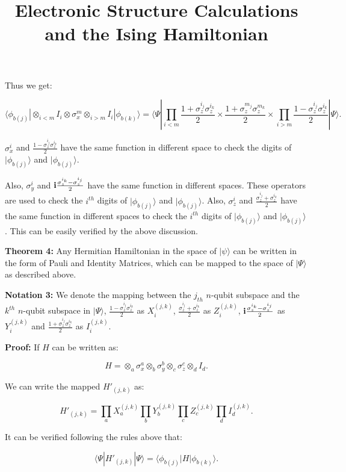 \documentclass{article}
\newcommand\x[1]{\sigma_x^{#1}}
\newcommand\y[1]{\sigma_y^{#1}}
\newcommand\z[1]{\sigma_z^{#1}}\title{Electronic Structure Calculations and the Ising Hamiltonian}
\begin{document}
Thus we get:

\begin{equation}
\langle\phi_{b(j)}|\otimes_{i<m} I_i\otimes \x{m}\otimes_{i>m}I_i|\phi_{b(k)}\rangle= \langle\Psi|\prod_{i<m}\frac{1+\z{i_j}\z{i_k}}{2}\times\frac{1+\z{m_j}\z{m_k}}{2}\times\prod_{i>m}\frac{1-\z{i_j}\z{i_k}}{2}|\Psi\rangle .
\end{equation}

 $\x{i}$ and $\frac{1-\z{i_j}\z{i_k}}{2}$ have the  same function in different space to check the digits of $|\phi_{b(j)}\rangle$ and $|\phi_{b(j)}\rangle$.

Also, $\y{i}$ and ${\bf i}\frac{\z{i_k}-\z{i_j}}{2}$ have the same function in different spaces.  These operators are used to check the $i^{th}$ digits of $|\phi_{b(j)}\rangle$ and $|\phi_{b(j)}\rangle$. Also, $\z{i}$ and $\frac{\z{i_j}+\z{i_k}}{2}$ have the  same function in different spaces to check the $i^{th}$ digits of $|\phi_{b(j)}\rangle$ and $|\phi_{b(j)}\rangle$. This can be easily verified by the above discussion.

{\bf Theorem 4:} Any Hermitian Hamiltonian in the space of $|\psi\rangle$ can be written in the form of Pauli and Identity Matrices, which can be mapped to the space of $|\Psi\rangle$ as  described above.

{\bf Notation 3:} We denote the mapping between the $j_{th}$ $n$-qubit subspace and the $k^{th}$ $n$-qubit subspace in $|\Psi\rangle$, $\frac{1-\z{i_j}\z{i_k}}{2}$ as $X_i^{(j,k)}$, $\frac{\z{i_j}+\z{i_k}}{2}$ as $Z_i^{(j,k)}$, ${\bf i}\frac{\z{i_k}-\z{i_j}}{2}$ as $Y_i^{(j,k)}$ and $\frac{1+\z{i_j}\z{i_k}}{2}$ as $I_i^{(j,k)}$.

{\bf Proof:}
If $H$ can be written as:

\begin{equation}
H=\otimes_a\x{a}\otimes_b\y{b}\otimes_c\z{c}\otimes_dI_{d} .
\end{equation}

We can write the mapped $H'_{(j,k)}$ as:

\begin{equation}
H'_{(j,k)}=\prod_aX_a^{(j,k)}\prod_bY_b^{(j,k)}\prod_cZ_c^{(j,k)}\prod_dI_d^{(j,k)} .
\end{equation}

It can be verified following the rules above that:

\begin{equation}
\langle\Psi|H'_{(j,k)}|\Psi\rangle=\langle\phi_{b(j)}|H|\phi_{b(k)}\rangle .
\end{equation}
\end{document}
